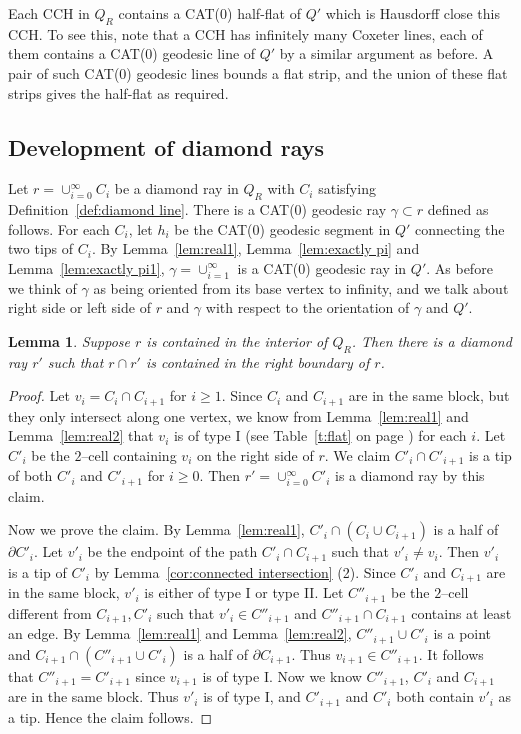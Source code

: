 \documentclass[11pt]{amsart}
\newtheorem{lemma}[theorem]{Lemma}
\theoremstyle{definition}
\begin{document}
Each CCH in $Q_R$ contains a CAT(0) half-flat of $Q'$ which is Hausdorff close this CCH. To see this, note that a CCH has infinitely many Coxeter lines, each of them contains a CAT(0) geodesic line of $Q'$ by a similar argument as before. A pair of such CAT(0) geodesic lines bounds a flat strip, and the union of these flat strips gives the half-flat as required.

\subsection{Development of diamond rays} 
\label{subsec:development of diamont rays}
Let $r=\cup_{i=0}^{\infty}C_i$ be a diamond ray in $Q_R$ with $C_i$ satisfying Definition~\ref{def:diamond line}. There is a CAT(0) geodesic ray $\gamma\subset r$ defined as follows. For each $C_i$, let $h_i$ be the CAT(0) geodesic segment in $Q'$ connecting the two tips of $C_i$. By Lemma~\ref{lem:real1}, Lemma~\ref{lem:exactly pi} and Lemma~\ref{lem:exactly pi1}, $\gamma=\cup_{i=1}^{\infty}$ is a CAT(0) geodesic ray in $Q'$. As before we think of $\gamma$ as being oriented from its base vertex to infinity, and we talk about right side or left side of $r$ and $\gamma$ with respect to the orientation of $\gamma$ and $Q'$.

\begin{lemma}
	\label{lem:right shift}
	Suppose $r$ is contained in the interior of $Q_R$. Then there is a diamond ray $r'$ such that $r\cap r'$ is contained in the right boundary of $r$.
\end{lemma}

\begin{proof}
	Let $v_i=C_i\cap C_{i+1}$ for $i\ge 1$. Since $C_i$ and $C_{i+1}$ are in the same block, but they only intersect along one vertex, we know from Lemma~\ref{lem:real1} and Lemma~\ref{lem:real2} that $v_i$ is of type I (see Table~\ref{t:flat} on page \pageref{t:flat}) for each $i$. Let $C'_i$ be the $2$--cell containing $v_i$ on the right side of $r$. We claim $C'_i\cap C'_{i+1}$ is a tip of both $C'_i$ and $C'_{i+1}$ for $i\ge 0$. Then $r'=\cup_{i=0}^{\infty}C'_i$ is a diamond ray by this claim.
	
	Now we prove the claim. By Lemma~\ref{lem:real1}, $C'_{i}\cap (C_i\cup C_{i+1})$ is a half of $\partial C'_i$. Let $v'_i$ be the endpoint of the path $C'_i\cap C_{i+1}$ such that $v'_i\neq v_i$. Then $v'_i$ is a tip of $C'_i$ by Lemma~\ref{cor:connected intersection} (2). Since $C'_i$ and $C_{i+1}$ are in the same block, $v'_i$ is either of type I or type II. Let $C''_{i+1}$ be the $2$--cell different from $C_{i+1},C'_i$ such that $v'_i\in C''_{i+1}$ and $C''_{i+1}\cap C_{i+1}$ contains at least an edge. By Lemma~\ref{lem:real1} and Lemma~\ref{lem:real2}, $C''_{i+1}\cup C'_i$ is a point and $C_{i+1}\cap (C''_{i+1}\cup C'_i)$ is a half of $\partial C_{i+1}$. Thus $v_{i+1}\in C''_{i+1}$. It follows that $C''_{i+1}=C'_{i+1}$ since $v_{i+1}$ is of type I. Now we know $C''_{i+1}$, $C'_i$ and $C_{i+1}$ are in the same block. Thus $v'_i$ is of type I, and $C'_{i+1}$ and $C'_i$ both contain $v'_i$ as a tip. Hence the claim follows. 
\end{proof}
\end{document}
